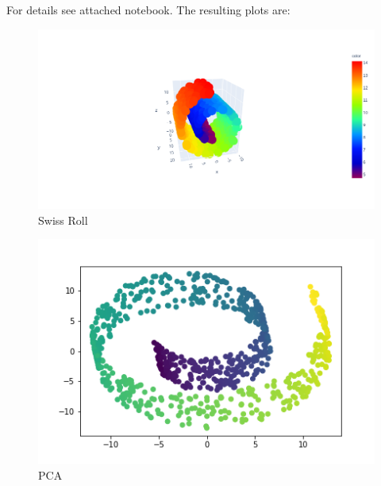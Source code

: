 For details see attached notebook. The resulting plots are:

\begin{figure}[H]
\begin{center}
\includegraphics[width=1\textwidth]{swiss_roll.png}
\caption{Swiss Roll}
\end{center}
\end{figure}


\begin{figure}[H]
\begin{center}   
\includegraphics[width=1\textwidth]{pca.png}
\caption{PCA}
\end{center}
\end{figure}

